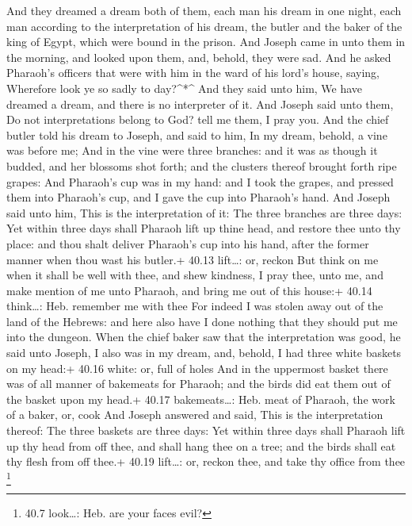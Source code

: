  And they dreamed a dream both of them, each man his dream
in one night, each man according to the interpretation of his dream, the
butler and the baker of the king of Egypt, which were bound in the
prison.  And Joseph came in unto them in the morning, and
looked upon them, and, behold, they were sad.  And he asked
Pharaoh's officers that were with him in the ward of his lord's house,
saying, Wherefore look ye so sadly to day?\^{}*\^{}  And
they said unto him, We have dreamed a dream, and there is no interpreter
of it. And Joseph said unto them, Do not interpretations belong to God?
tell me them, I pray you.  And the chief butler told his
dream to Joseph, and said to him, In my dream, behold, a vine was before
me;  And in the vine were three branches: and it was as
though it budded, and her blossoms shot forth; and the clusters thereof
brought forth ripe grapes:  And Pharaoh's cup was in my
hand: and I took the grapes, and pressed them into Pharaoh's cup, and I
gave the cup into Pharaoh's hand.  And Joseph said unto
him, This is the interpretation of it: The three branches are three
days:  Yet within three days shall Pharaoh lift up thine
head, and restore thee unto thy place: and thou shalt deliver Pharaoh's
cup into his hand, after the former manner when thou wast his butler.+
40.13 lift\ldots: or, reckon  But think on me when it shall
be well with thee, and shew kindness, I pray thee, unto me, and make
mention of me unto Pharaoh, and bring me out of this house:+ 40.14
think\ldots: Heb. remember me with thee  For indeed I was
stolen away out of the land of the Hebrews: and here also have I done
nothing that they should put me into the dungeon.  When the
chief baker saw that the interpretation was good, he said unto Joseph, I
also was in my dream, and, behold, I had three white baskets on my
head:+ 40.16 white: or, full of holes  And in the uppermost
basket there was of all manner of bakemeats for Pharaoh; and the birds
did eat them out of the basket upon my head.+ 40.17 bakemeats\ldots:
Heb. meat of Pharaoh, the work of a baker, or, cook  And
Joseph answered and said, This is the interpretation thereof: The three
baskets are three days:  Yet within three days shall
Pharaoh lift up thy head from off thee, and shall hang thee on a tree;
and the birds shall eat thy flesh from off thee.+ 40.19 lift\ldots: or,
reckon thee, and take thy office from thee \footnote{40.7 look\ldots:
  Heb. are your faces evil?}

